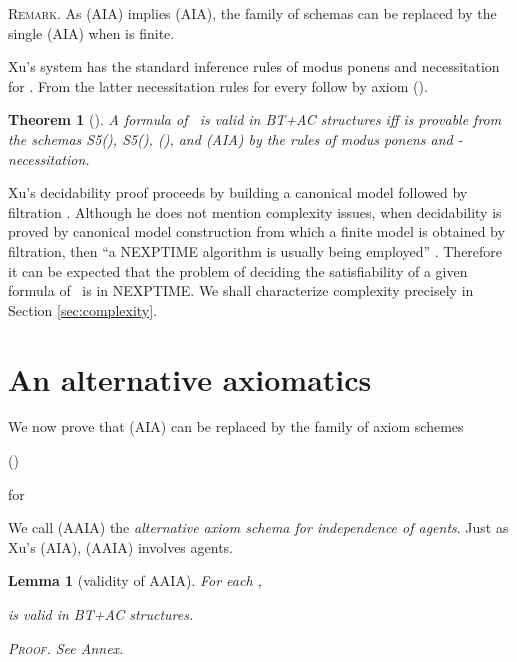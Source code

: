 \documentclass{article}
\newtheorem{theorem}{Theorem}
\newtheorem{lemma}{Lemma}
\newenvironment{remark}{\medskip\noindent \textsc{Remark.}} {\medskip}
\newenvironment{pf}{\em \medskip\noindent \textsc{Proof.}}
{\hspace*{\fill}\nolinebreak[2]\hspace*{\fill}\medskip}
\newcommand{\InclBox}[1]{}
\newcommand{\LCSTIT}{}
\begin{document}
\begin{remark}
As (AIA) implies (AIA), the family of schemas can be replaced by
the single (AIA) when  is finite.
\end{remark}



Xu's system has the standard inference rules of modus ponens and
necessitation for . From the latter necessitation rules for
every  follow by axiom (\InclBox{i}).

\begin{theorem}[\mbox{\cite[Chapter 17]{belnap01facing}}]\label{XuCompleteness}
A formula  of \LCSTIT\ is valid in BT+AC structures iff  is provable from
the schemas S5(), S5(), (\InclBox{i}), and (AIA) by the rules of
modus ponens and -necessitation.
\end{theorem}


Xu's decidability proof proceeds by building a canonical model
followed by filtration \cite[Theorems 17-18]{belnap01facing}.
Although he does not mention complexity issues,
when decidability is proved by canonical model construction
from which a finite model is obtained by filtration, then
``a NEXPTIME algorithm is usually being employed''
\cite[Appendix C, p.\ 515]{Blackburn:2001:ML}.
Therefore it can be expected that the problem of deciding
the satisfiability of a given formula of \LCSTIT\
is in NEXPTIME.
We shall characterize complexity precisely in Section \ref{sec:complexity}.





\goodbreak
\section{An alternative axiomatics }\label{sec:alterAx}


We now prove that (AIA) can be replaced by the family of axiom schemes
\begin{itemlist}{(\InclBox{i})}
  \item[(AAIA)]
     \hfill for 
\end{itemlist}
We call (AAIA) the \emph{alternative axiom schema for independence of agents}.
Just as Xu's (AIA), (AAIA) involves  agents.

\begin{lemma}[validity of AAIA]\label{lem:validAaia}
For each ,

is valid in BT+AC structures.


\begin{pf}
See Annex.
\end{pf}
\end{lemma}
\end{document}
